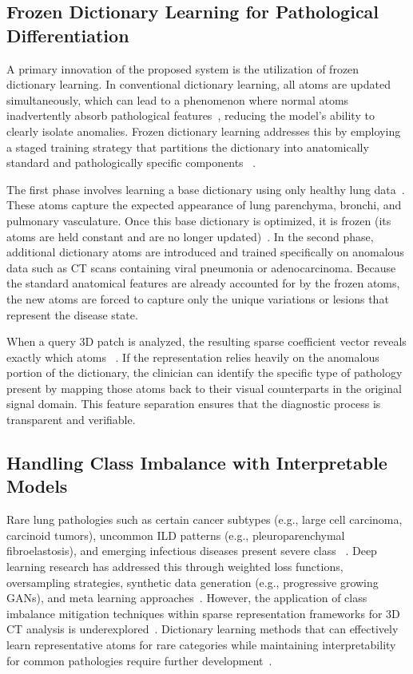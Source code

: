 \subsection{Frozen Dictionary Learning for Pathological Differentiation}

A primary innovation of the proposed system is the utilization of frozen dictionary learning. In conventional dictionary learning, all
atoms are updated simultaneously, which can lead to a phenomenon where normal atoms inadvertently absorb pathological features~\cite{aharon2006ksvd}, reducing
the model's ability to clearly isolate anomalies. Frozen dictionary learning addresses this by employing a staged training strategy that
partitions the dictionary into anatomically standard and pathologically specific components~\cite{nika2014change} .

The first phase involves learning a base dictionary using only healthy lung data~\cite{xu2012lowdose}. These atoms capture the expected appearance of
lung parenchyma, bronchi, and pulmonary vasculature. Once this base dictionary is optimized, it is frozen (its atoms are held
constant and are no longer updated)~\cite{nika2014change}. In the second phase, additional dictionary atoms are introduced and trained specifically on
anomalous data such as CT scans containing viral pneumonia or adenocarcinoma. Because the standard anatomical features are already
accounted for by the frozen atoms, the new atoms are forced to capture only the unique variations or lesions that represent the
disease state.

When a query 3D patch is analyzed, the resulting sparse coefficient vector reveals exactly which atoms ~\cite{jiang2013label}. If the
representation relies heavily on the anomalous portion of the dictionary, the clinician can identify the specific type of pathology
present by mapping those atoms back to their visual counterparts in the original signal domain. This feature separation ensures
that the diagnostic process is transparent and verifiable.

\subsection{Handling Class Imbalance with Interpretable Models}
Rare lung pathologies such as certain cancer subtypes (e.g., large cell carcinoma, carcinoid tumors), uncommon ILD patterns
(e.g., pleuroparenchymal fibroelastosis), and emerging infectious diseases present severe class ~\cite{liu2022deep}. Deep learning
research has addressed this through weighted loss functions, oversampling strategies, synthetic data generation (e.g., progressive
growing GANs), and meta learning approaches~\cite{johnson2019survey}. However, the application of class imbalance mitigation techniques within sparse
representation frameworks for 3D CT analysis is underexplored~\cite{zhao2014survey}. Dictionary learning methods that can effectively learn representative
atoms for rare categories while maintaining interpretability for common pathologies require further development~\cite{jiang2013label}.

